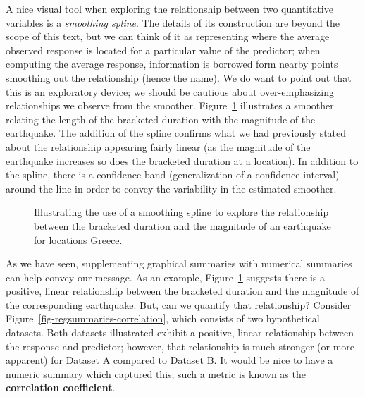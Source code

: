\documentclass[
  letterpaper,
  DIV=11,
  numbers=noendperiod]{scrreprt}
\theoremstyle{plain}
\theoremstyle{definition}
\theoremstyle{definition}
\theoremstyle{remark}
\begin{document}
A nice visual tool when exploring the relationship between two
quantitative variables is a \emph{smoothing spline}. The details of its
construction are beyond the scope of this text, but we can think of it
as representing where the average observed response is located for a
particular value of the predictor; when computing the average response,
information is borrowed form nearby points smoothing out the
relationship (hence the name). We do want to point out that this is an
exploratory device; we should be cautious about over-emphasizing
relationships we observe from the smoother.
Figure~\ref{fig-regsummaries-spline} illustrates a smoother relating the
length of the bracketed duration with the magnitude of the earthquake.
The addition of the spline confirms what we had previously stated about
the relationship appearing fairly linear (as the magnitude of the
earthquake increases so does the bracketed duration at a location). In
addition to the spline, there is a confidence band (generalization of a
confidence interval) around the line in order to convey the variability
in the estimated smoother.

\begin{figure}


\caption{\label{fig-regsummaries-spline}Illustrating the use of a
smoothing spline to explore the relationship between the bracketed
duration and the magnitude of an earthquake for locations Greece.}

\end{figure}%

As we have seen, supplementing graphical summaries with numerical
summaries can help convey our message. As an example,
Figure~\ref{fig-regsummaries-spline} suggests there is a positive,
linear relationship between the bracketed duration and the magnitude of
the corresponding earthquake. But, can we quantify that relationship?
Consider Figure~\ref{fig-regsummaries-correlation}, which consists of
two hypothetical datasets. Both datasets illustrated exhibit a positive,
linear relationship between the response and predictor; however, that
relationship is much stronger (or more apparent) for Dataset A compared
to Dataset B. It would be nice to have a numeric summary which captured
this; such a metric is known as the \textbf{correlation coefficient}.
\end{document}
